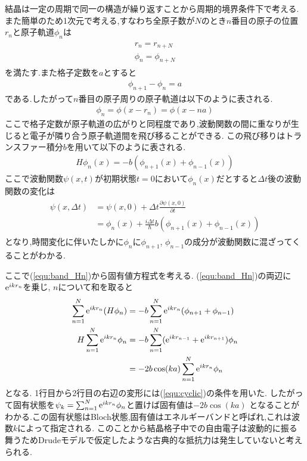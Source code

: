 結晶は一定の周期で同一の構造が繰り返すことから周期的境界条件下で考える.
また簡単のため1次元で考える,すなわち全原子数が$N$のとき$n$番目の原子の位置$r_n$と原子軌道$\phi_n$は
\begin{align}
  \begin{split}
    \label{equ:cyclic}
    r_n=r_{n+N}\\
    \phi_n=\phi_{n+N}
  \end{split}
\end{align}
を満たす.また格子定数を$a$とすると
\begin{align}
  \phi_{n+1}-\phi_n=a
\end{align}
である.したがって$n$番目の原子周りの原子軌道は以下のように表される.
\begin{align}
  \phi_n=\phi(x-r_n)=\phi(x-na)
\end{align}
ここで格子定数が原子軌道の広がりと同程度であり,波動関数の間に重なりが生じると電子が隣り合う原子軌道間を飛び移ることができる.
この飛び移りはトランスファー積分$b$を用いて以下のように表される.
\begin{align}
  \label{equ:band_Hn}
  H\phi_n(x)=-b\left(\phi_{n+1}(x)+\phi_{n-1}(x)\right)
\end{align}
ここで波動関数$\psi(x,t)$が初期状態$t=0$において$\phi_n(x)$だとすると$\Delta t$後の波動関数の変化は
\begin{align}
  \begin{split}
    \psi(x,\Delta t)&=\psi(x,0)+\Delta t\frac{\partial \psi(x,0)}{\partial t}\\
    &=\phi_n(x)+\frac{i\Delta t}{\hbar}b\left(\phi_{n+1}(x)+\phi_{n-1}(x)\right)
  \end{split}
\end{align}
となり,時間変化に伴いたしかに$\phi_n$に$\phi_{n+1}$, $\phi_{n-1}$の成分が波動関数に混ざってくることがわかる.

ここで(\ref{equ:band_Hn})から固有値方程式を考える.
(\ref{equ:band_Hn})の両辺に${\rm e}^{ikr_n}$を乗じ,
$n$について和を取ると
\begin{align}
  \begin{split}
    \label{equ:eigen_vector}
    \sum_{n=1}^N{\rm e}^{ikr_n}(H\phi_n)&=-b\sum_{n=1}^N{\rm e}^{ikr_n}(\phi_{n+1}+\phi_{n-1})\\
    H\sum_{n=1}^N{\rm e}^{ikr_n}\phi_n&=-b\sum_{n=1}^N({\rm e}^{ikr_{n-1}}+{\rm e}^{ikr_{n+1}})\phi_n\\
    &=-2b\cos(ka)\sum_{n=1}^N{\rm e}^{ikr_n}\phi_n
  \end{split}
\end{align}
となる.
1行目から2行目の右辺の変形には(\ref{equ:cyclic})の条件を用いた.
したがって固有状態を$\psi_k=\sum_{n=1}^N{\rm e}^{ikr_n}\phi_n$と置けば固有値は$-2b\cos(ka)$
となることがわかる.この固有状態はBloch状態,固有値はエネルギーバンドと呼ばれ,これは波数$k$によって指定される.
このことから結晶格子中での自由電子は波動的に振る舞うためDrudeモデルで仮定したような古典的な抵抗力は発生していないと考えられる.

